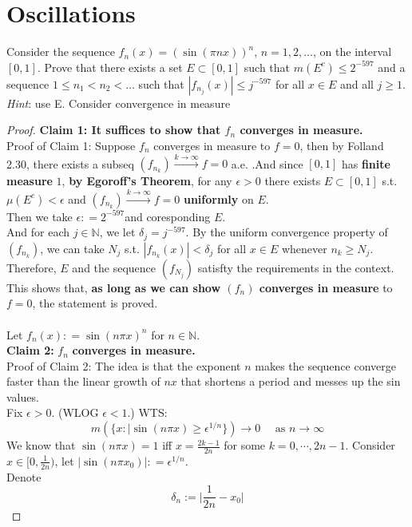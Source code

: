 \documentclass[lang=cn,11pt]{elegantbook}
\begin{document}
\section{Oscillations}
  Consider the sequence $f_n(x)=(\sin(\pi n x))^n$, $n=1,2,\dots$, on the interval $[0,1]$. Prove that there exists a set $E\subset[0,1]$ such that $m(E^c)\le 2^{-597}$ and a sequence $1\le n_1<n_2<\dots$ such that $|f_{n_j}(x)|\le j^{-597}$ for all $x\in E$ and all $j\ge1$. \textit{Hint}: use E. Consider convergence in measure
\begin{proof}
\textbf{Claim 1: It suffices to show that $f_n $ converges in measure.}\\
Proof of Claim 1: Suppose $f_n $ converges in measure to $f = 0$, then by Folland 2.30, there exists a subseq $(f_{n_k}) \overset{k \to \infty}{\longrightarrow} f= 0$ a.e. .And since $[0,1]$ has \textbf{finite measure} $1$, \textbf{by Egoroff's Theorem},  for any $\epsilon>0$ there exists $E \subset [0,1]$ s.t. $\mu(E^c) < \epsilon$ and $(f_{n_k}) \overset{k \to \infty}{\longrightarrow} f= 0$ \textbf{uniformly} on $E$. \\
Then we take $\epsilon : = 2^{-597}$and coresponding $E$.\\
And for each $j \in \mathbb{N}$, we let $\delta_j = j^{-597}$. By the uniform convergence property of $(f_{n_k})$, we can take $N_j$ s.t. $|f_{n_k}(x)| < \delta_j $ for all $x \in E$ whenever $n_k \geq N_j$.\\
Therefore, $E$ and the sequence $(f_{N_j})$  satisfty the requirements in the context.\\
This shows that, \textbf{as long as we can show $(f_n)$ converges in measure} to $f = 0$, the statement is proved.\\\\
Let $f_n (x) : = \sin( n\pi x)^n $ for $n\in \mathbb{N}$.\\
\textbf{Claim 2:} $f_n $ \textbf{converges in measure.}\\
Proof of Claim 2: The idea is that the exponent $n$ makes the sequence converge faster than the linear growth of $nx$ that shortens a period and messes up the sin values.\\ 
Fix $\epsilon  > 0$. (WLOG $\epsilon < 1$.) WTS: \[
m(\{ x: |\sin (n \pi x) \geq \epsilon^{1/n}  \}) \to 0 \quad \text{ as } n\to \infty
\]
We know that $\sin(n\pi x) = 1$ iff $x = \frac{2k-1}{2n}$ for some $k = 0,\cdots, 2n-1$.
Consider $x \in [0,\frac{1}{2n})$, let $|\sin(n \pi x_0 ) | : = \epsilon^{1/n}$.\\
Denote \[
\delta_n :=\Big |\frac{1}{2n} - x_0 \Big| 
\]
\end{proof}
\end{document}
